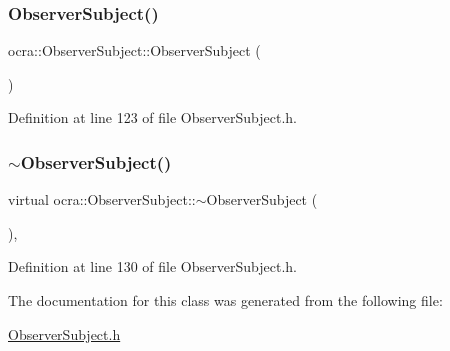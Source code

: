 \subsubsection{\texorpdfstring{Observer\+Subject()}{ObserverSubject()}}
{\footnotesize\ttfamily ocra\+::\+Observer\+Subject\+::\+Observer\+Subject (\begin{DoxyParamCaption}{ }\end{DoxyParamCaption})\hspace{0.3cm}{\ttfamily [inline]}}



Definition at line 123 of file Observer\+Subject.\+h.

\hypertarget{classocra_1_1ObserverSubject_a1017c89ce175d262f42324cb76ed5f3b}{}\label{classocra_1_1ObserverSubject_a1017c89ce175d262f42324cb76ed5f3b} 
\subsubsection{\texorpdfstring{$\sim$\+Observer\+Subject()}{~ObserverSubject()}}
{\footnotesize\ttfamily virtual ocra\+::\+Observer\+Subject\+::$\sim$\+Observer\+Subject (\begin{DoxyParamCaption}{ }\end{DoxyParamCaption})\hspace{0.3cm}{\ttfamily [inline]}, {\ttfamily [virtual]}}



Definition at line 130 of file Observer\+Subject.\+h.



The documentation for this class was generated from the following file\+:\begin{DoxyCompactItemize}
\item 
\hyperlink{ObserverSubject_8h}{Observer\+Subject.\+h}\end{DoxyCompactItemize}
